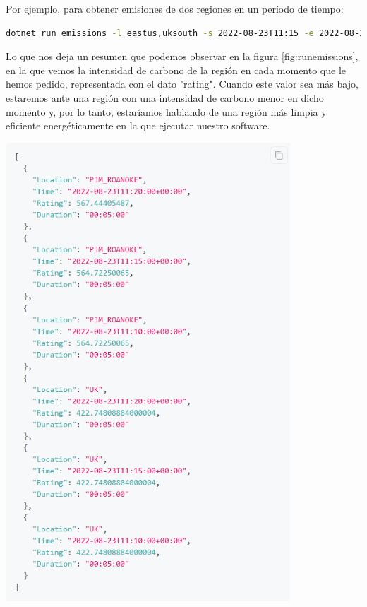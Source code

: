 \documentclass[12pt,a4paper]{report}
\begin{document}
Por ejemplo, para obtener emisiones de dos regiones en un período de tiempo:

\begin{tcolorbox}[colback=codebackground, colframe=codeborder, boxrule=0.8pt, arc=0mm, boxsep=5pt, left=5pt, right=5pt, top=5pt, bottom=5pt]
  \begin{lstlisting}[language=bash]
dotnet run emissions -l eastus,uksouth -s 2022-08-23T11:15 -e 2022-08-23T11:20
\end{lstlisting}
\end{tcolorbox}

Lo que nos deja un resumen que podemos observar en la figura \ref{fig:runemissions}, en la que vemos la intensidad de carbono de la región en cada momento que le hemos pedido, representada con el dato "rating". Cuando este valor sea más bajo, estaremos ante una región con una intensidad de carbono menor en dicho momento y, por lo tanto, estaríamos hablando de una región más limpia y eficiente energéticamente en la que ejecutar nuestro software.

\begin{center}
  \includegraphics[width=0.8\textwidth]{imagenes/CASDK_1.png}
  \label{fig:runemissions}
\end{center}
\end{document}

